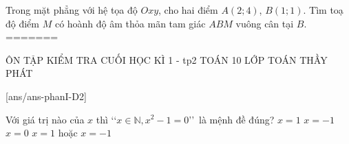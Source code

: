 \begin{ex}%
Trong mặt phẳng với hệ tọa độ $Oxy$, cho hai điểm $A(2;4)$, $B(1;1)$. Tìm toạ độ điểm $M$ có hoành độ âm thỏa mãn tam giác $ABM$ vuông cân tại $B$. 
=======
\begin{name}
	{ÔN TẬP KIỂM TRA CUỐI HỌC KÌ 1 - tp2}
	{TOÁN 10}
	{LỚP TOÁN THẦY PHÁT}
	{\thoigian}
\end{name}
[ans/ans-phanI-D2]
\caulc

\begin{ex}%
Với giá trị nào của $x$ thì \lq\lq $x\in\mathbb{N}, x^2-1=0$\rq\rq~là mệnh đề đúng?
\choice
{\True $x=1$}
{$x=-1$}
{$x=0$}
{$x=1$ hoặc $x=-1$}
\end{ex}


\end{ex}
